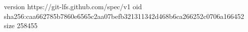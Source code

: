 version https://git-lfs.github.com/spec/v1
oid sha256:caa662785b7860e6565c2aa07befb321311342d468b6ca266252c0706a166452
size 258455
